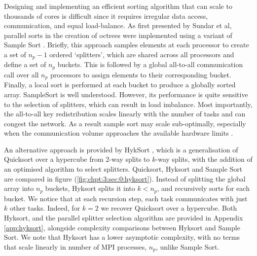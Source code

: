 Designing and implementing an efficient sorting algorithm that can scale to thousands of cores is difficult since it requires irregular data access, communication, and equal load-balance. As first presented by Sundar et al, parallel sorts in the creation of octrees were implemented using a variant of Sample Sort \cite{sundar2008bottom}. Briefly, this approach samples elements at each processor to create a set of $n_p - 1 $ ordered `splitters', which are shared across all processors and define a set of $n_p$ buckets. This is followed by a global all-to-all communication call over all $n_p$ processors to assign elements to their corresponding bucket. Finally, a local sort is performed at each bucket to produce a globally sorted array. SampleSort is well understood. However, its performance is quite sensitive to the selection of splitters, which can result in load imbalance. Most importantly, the all-to-all key redistribution scales linearly with the number of tasks and can congest the network. As a result sample sort may scale sub-optimally, especially when the communication volume approaches the available hardware limits \cite{sundar2013hyksort}.

An alternative approach is provided by HykSort \cite{sundar2013hyksort}, which is a generalisation of Quicksort over a hypercube \cite{wagar1987hyperquicksort} from 2-way splits to $k$-way splits, with the addition of an optimised algorithm to select splitters. Quicksort, Hyksort and Sample Sort are compared in figure (\ref{fig:chpt:3:sec:0:hyksort}). Instead of splitting the global array into $n_p$ buckets, Hyksort splits it into $k < n_p$, and recursively sorts for each bucket. We notice that at each recursion step, each task communicates with just $k$ other tasks. Indeed, for $k=2$ we recover Quicksort over a hypercube. Both Hyksort, and the parallel splitter selection algorithm are provided in Appendix \ref{app:hyksort}, alongside complexity comparisons between Hyksort and Sample Sort. We note that Hyksort has a lower asymptotic complexity, with no terms that scale linearly in number of MPI processes, $n_p$, unlike Sample Sort.

